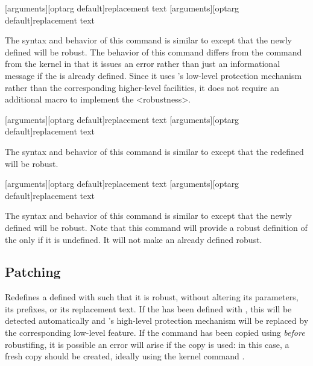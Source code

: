 \documentclass{ltxdockit}[2010/09/26]
\begin{document}
\begin{ltxsyntax}

[arguments][optarg default]{replacement text}
[arguments][optarg default]{replacement text}

The syntax and behavior of this command is similar to  except that the newly defined  will be robust. The behavior of this command differs from the  command from the \latex kernel in that it issues an error rather than just an informational message if the  is already defined. Since it uses \etex's low-level protection mechanism rather than the corresponding higher-level \latex facilities, it does not require an additional macro to implement the <robustness>.

[arguments][optarg default]{replacement text}
[arguments][optarg default]{replacement text}

The syntax and behavior of this command is similar to  except that the redefined  will be robust.

[arguments][optarg default]{replacement text}
[arguments][optarg default]{replacement text}

The syntax and behavior of this command is similar to  except that the newly defined  will be robust. Note that this command will provide a robust definition of the  only if it is undefined. It will not make an already defined  robust.

\end{ltxsyntax}

\subsection{Patching}
\label{use:pat}

\begin{ltxsyntax}


Redefines a  defined with  such that it is robust, without altering its parameters, its prefixes, or its replacement text. If the  has been defined with , this will be detected automatically and \latex's high-level protection mechanism will be replaced by the corresponding low-level \etex feature. If the command has been copied using  \emph{before} robustifing, it is possible an error will arise if the copy is used: in this case, a fresh copy should be created, ideally using the \latex kernel command .

\end{ltxsyntax}
\end{document}
